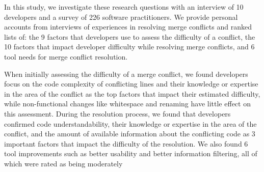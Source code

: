 In this study, we investigate these research questions with an interview of 10 developers and a survey of 226 software practitioners. We provide personal accounts from interviews of experiences in resolving merge conflicts and ranked lists of: the 9 factors that developers use to assess the difficulty of a conflict, the 10 factors that impact developer difficulty while resolving merge conflicts, and 6 tool needs for merge conflict resolution.

When initially assessing the difficulty of a merge conflict, we found developers focus on the code complexity of conflicting lines and their knowledge or expertise in the area of the conflict as the top factors that impact their estimated difficulty, while non-functional changes like whitespace and renaming have little effect on this assessment. 
During the resolution process, we found that developers confirmed code understandability, their knowledge or expertise in the area of the conflict, and the amount of available information about the conflicting code as 3 important factors that impact the difficulty of the resolution.
We also found 6 tool improvements such as better usability and better information filtering, all of which were rated as being moderately 
